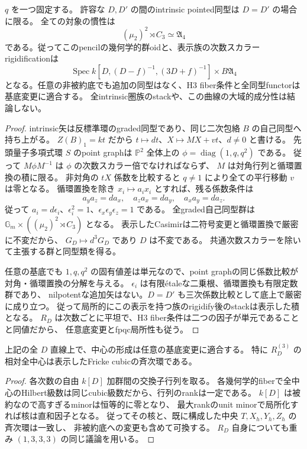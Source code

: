 \begin{theorem}[pencilの全intrinsic矢と相対表示stack]
\label{thm:quantum-triangle-groupoid}
$q$ を一つ固定する。
許容な $D,D'$ の間のintrinsic pointed同型は $D=D'$ の場合に限る。
全ての対象の慣性は
\[
 (\mu_2)^2\rtimes C_3\simeq\mathfrak A_4
\]
である。従ってこのpencilの幾何学的群oidと、表示族の次数スカラーrigidificationは
\[
 \operatorname{Spec}k[D,(D-f)^{-1},(3D+f)^{-1}]\times B\mathfrak A_4
\]
となる。任意の非被約底でも追加の同型はなく、H3 fiber条件と全同型functorは基底変更に適合する。
全intrinsic圏族のstackや、この曲線の大域的成分性は結論しない。
\end{theorem}
\begin{proof}
intrinsic矢は反標準環のgraded同型であり、同じ二次包絡 $B$ の自己同型へ持ち上がる。
$Z(B)_1=kt$ だから $t\mapsto dt$、$X\mapsto MX+vt$、$d\ne0$ と書ける。
先頭量子多項式環 $S$ のpoint graphは $\mathbb P^2$ 全体上の
$\phi=\operatorname{diag}(1,q,q^2)$ である。
従って $M\phi M^{-1}$ は $\phi$ の次数スカラー倍でなければならず、
$M$ は対角行列と循環置換の積に限る。
非対角の $tX$ 係数を比較すると $q\ne1$ により全ての平行移動 $v$ は零となる。
循環置換を除き $x_i\mapsto a_i x_i$ とすれば、残る係数条件は
\[
 a_ya_z=da_x,\quad a_za_x=da_y,\quad a_xa_y=da_z.
\]
従って $a_i=d\epsilon_i$、$\epsilon_i^2=1$、$\epsilon_x\epsilon_y\epsilon_z=1$ である。
全graded自己同型群は $\mathbb G_m\times((\mu_2)^2\rtimes C_3)$ となる。
表示したCasimirは二符号変更と循環置換で厳密に不変だから、
$G_D\mapsto d^3G_D$ であり $D$ は不変である。
共通次数スカラーを除いて主張する群と同型類を得る。

任意の基底でも $1,q,q^2$ の固有値差は単元なので、point graphの同じ係数比較が
対角・循環置換の分解を与える。
$\epsilon_i$ は有限\'{e}taleな二乗根、循環置換も有限定数群であり、
nilpotentな追加矢はない。$D=D'$ も三次係数比較として底上で厳密に成り立つ。
従って局所的にこの表示を持つ族のrigidify後のstackは表示した積となる。
$R_D$ は次数ごとに平坦で、H3 fiber条件は二つの因子が単元であることと同値だから、
任意底変更とfpqc局所性も従う。
\end{proof}

\begin{proposition}[中心の相対基底変更]
上記の全 $D$ 直線上で、中心の形成は任意の基底変更に適合する。
特に $R_D^{(3)}$ の相対全中心は表示したFricke cubicの斉次環である。
\end{proposition}
\begin{proof}
各次数の自由 $k[D]$ 加群間の交換子行列を取る。
各幾何学的fiberで全中心のHilbert級数は同じcubic級数だから、行列のrankは一定である。
$k[D]$ は被約なので高すぎるminorは恒等的に零となり、
最大rankのunit minorで局所化すれば核は直和因子となる。
従ってその核と、既に構成した中央 $T,X_h,Y_h,Z_h$ の斉次環は一致し、
非被約底への変更も含めて可換する。
$R_D$ 自身についても重み $(1,3,3,3)$ の同じ議論を用いる。
\end{proof}
